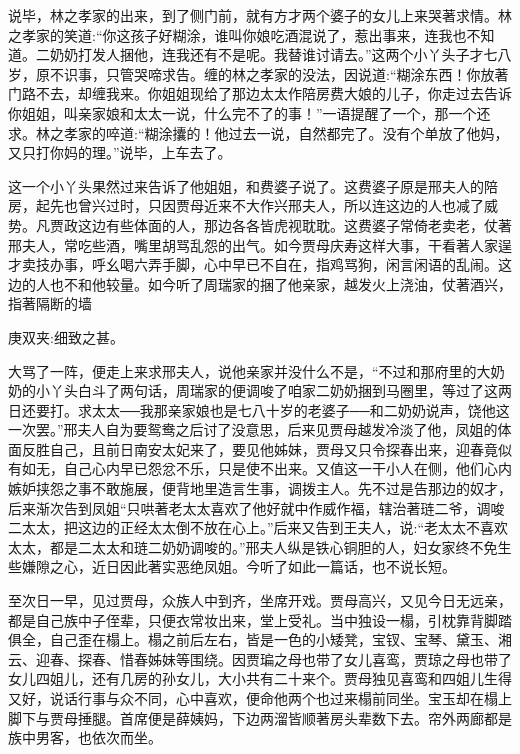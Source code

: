 \begin{parag}
    说毕，林之孝家的出来，到了侧门前，就有方才两个婆子的女儿上来哭著求情。林之孝家的笑道:“你这孩子好糊涂，谁叫你娘吃酒混说了，惹出事来，连我也不知道。二奶奶打发人捆他，连我还有不是呢。我替谁讨请去。”这两个小丫头子才七八岁，原不识事，只管哭啼求告。缠的林之孝家的没法，因说道:“糊涂东西！你放著门路不去，却缠我来。你姐姐现给了那边太太作陪房费大娘的儿子，你走过去告诉你姐姐，叫亲家娘和太太一说，什么完不了的事！”一语提醒了一个，那一个还求。林之孝家的啐道:“糊涂攮的！他过去一说，自然都完了。没有个单放了他妈，又只打你妈的理。”说毕，上车去了。
\end{parag}


\begin{parag}
    这一个小丫头果然过来告诉了他姐姐，和费婆子说了。这费婆子原是邢夫人的陪房，起先也曾兴过时，只因贾母近来不大作兴邢夫人，所以连这边的人也减了威势。凡贾政这边有些体面的人，那边各各皆虎视耽耽。这费婆子常倚老卖老，仗著邢夫人，常吃些酒，嘴里胡骂乱怨的出气。如今贾母庆寿这样大事，干看著人家逞才卖技办事，呼幺喝六弄手脚，心中早已不自在，指鸡骂狗，闲言闲语的乱闹。这边的人也不和他较量。如今听了周瑞家的捆了他亲家，越发火上浇油，仗著酒兴，指著隔断的墙\begin{note}庚双夹:细致之甚。\end{note}大骂了一阵，便走上来求邢夫人，说他亲家并没什么不是，“不过和那府里的大奶奶的小丫头白斗了两句话，周瑞家的便调唆了咱家二奶奶捆到马圈里，等过了这两日还要打。求太太──我那亲家娘也是七八十岁的老婆子──和二奶奶说声，饶他这一次罢。”邢夫人自为要鸳鸯之后讨了没意思，后来见贾母越发冷淡了他，凤姐的体面反胜自己，且前日南安太妃来了，要见他姊妹，贾母又只令探春出来，迎春竟似有如无，自己心内早已怨忿不乐，只是使不出来。又值这一干小人在侧，他们心内嫉妒挟怨之事不敢施展，便背地里造言生事，调拨主人。先不过是告那边的奴才，后来渐次告到凤姐“只哄著老太太喜欢了他好就中作威作福，辖治著琏二爷，调唆二太太，把这边的正经太太倒不放在心上。”后来又告到王夫人，说:“老太太不喜欢太太，都是二太太和琏二奶奶调唆的。”邢夫人纵是铁心铜胆的人，妇女家终不免生些嫌隙之心，近日因此著实恶绝凤姐。今听了如此一篇话，也不说长短。
\end{parag}


\begin{parag}
    至次日一早，见过贾母，众族人中到齐，坐席开戏。贾母高兴，又见今日无远亲，都是自己族中子侄辈，只便衣常妆出来，堂上受礼。当中独设一榻，引枕靠背脚踏俱全，自己歪在榻上。榻之前后左右，皆是一色的小矮凳，宝钗、宝琴、黛玉、湘云、迎春、探春、惜春姊妹等围绕。因贾㻞之母也带了女儿喜鸾，贾琼之母也带了女儿四姐儿，还有几房的孙女儿，大小共有二十来个。贾母独见喜鸾和四姐儿生得又好，说话行事与众不同，心中喜欢，便命他两个也过来榻前同坐。宝玉却在榻上脚下与贾母捶腿。首席便是薛姨妈，下边两溜皆顺著房头辈数下去。帘外两廊都是族中男客，也依次而坐。
\end{parag}



